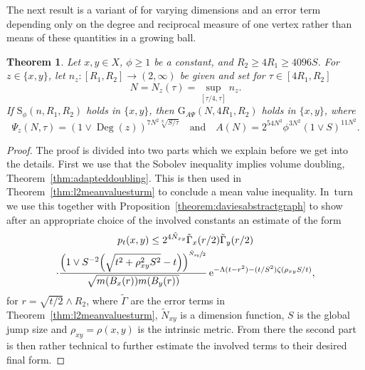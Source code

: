 \documentclass[10pt]{amsart}
\newcommand{\rG}{\mathrm{G}}
\newcommand{\rS}{\mathrm{S}}
\theoremstyle{plain}
\newtheorem{theorem}{Theorem}[section]
\theoremstyle{definition}
\newcommand{\euler}{\mathrm{e}}
\DeclareMathOperator{\Deg}{Deg}
\begin{document}
The next result is a variant of \cite[Th.\,6.1]{KellerRose-22a} for varying dimensions and an error term depending only on the degree and reciprocal measure of {one vertex} rather than means of these quantities in a growing ball.

\begin{theorem}\label{thm:main1sturm}
Let $x,y\in X$, $\phi\geq 1$ be a constant, and
$ R_2\geq 4R_1\geq 4096S$. For $z\in\{x,y\}$, let $ n_z\colon[R_1,R_2]\to(2,\infty) $ be given and set for $\tau\in [4R_1,R_2]$
\[
N=N_z(\tau)=\sup_{[\tau/4,\tau]}n_z.
\]
If $\rS_\phi(n,R_1,R_2)$ holds in $\{x,y\}$,
then $\rG_{A\Psi}(N,4R_1,R_2)$ holds in $\{x,y\}$,
where
\[
\Psi_z(N,\tau)=\left(1\vee \Deg(z)
\right)^{7N^2\sqrt[N]{S/\tau}}\quad\text{and}\quad
A(N)=2^{54N^3}\phi
^{3N^2}(1\vee S)^{11N^2}.
\]
\end{theorem}
\begin{proof}
The proof is divided into two parts which we explain before we get into the details. First we use that the Sobolev inequality implies volume doubling, Theorem~\ref{thm:adapteddoubling}. This is then used in Theorem~\ref{thm:l2meanvaluesturm} to conclude a mean value inequality. In~turn we use this together with Proposition~\ref{theorem:daviesabstractgraph} to show after an appropriate choice of the involved constants an estimate of the form
\begin{multline*}
p_{t}(x,y)
\leq 2^{4{\tilde N_{xy}}}
\tilde \Gamma_x(r/2)\tilde \Gamma_y(r/2)
\\
\cdot
\frac{
\left(1\vee {S^{-2}}{\left(\sqrt{t^2+\rho_{xy}^2S^2}-t\right)}\right)^{\sfrac{\tilde N_{xy}}{2}}}
{\sqrt{m(B_{x}(r))m(B_{y}(r))}}\,
\euler^{-\Lambda (t- r^2)-(t/S^2)\zeta(\rho_{xy}S/t)},
\end{multline*}
for $ r=\sqrt{t/2}\wedge R_{2} $, where $\tilde \Gamma $ are the error terms in Theorem~\ref{thm:l2meanvaluesturm}, $ \tilde N_{xy}$ is a dimension function, $S$ is the global jump size and $ \rho_{xy}=\rho(x,y) $ is the intrinsic metric. From there the second part is then rather technical to further estimate the involved terms to their desired final form.


\end{proof}
\end{document}
